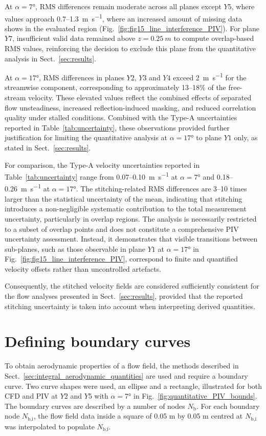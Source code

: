 \documentclass[wes, manuscript]{copernicus}
\begin{document}
At $\alpha = 7\unit{\degree}$, RMS differences remain moderate across all planes except $Y5$, where values approach 0.7–1.3~\unit{m s^{-1}}, where an increased amount of missing data shows in the evaluated region (Fig.~\ref{fig:fig15_line_interference_PIV}). For plane $Y7$, insufficient valid data remained above $z = 0.25~\unit{m}$ to compute overlap-based RMS values, reinforcing the decision to exclude this plane from the quantitative analysis in Sect.~\ref{sec:results}.

At $\alpha = 17\unit{\degree}$, RMS differences in planes $Y2$, $Y3$ and $Y4$ exceed 2~\unit{m s^{-1}} for the streamwise component, corresponding to approximately 13–18\% of the free-stream velocity. These elevated values reflect the combined effects of separated flow unsteadiness, increased reflection-induced masking, and reduced correlation quality under stalled conditions. Combined with the Type-A uncertainties reported in Table~\ref{tab:uncertainty}, these observations provided further justification for limiting the quantitative analysis at $\alpha = 17\unit{\degree}$ to plane $Y1$ only, as stated in Sect.~\ref{sec:results}.

For comparison, the Type-A velocity uncertainties reported in Table~\ref{tab:uncertainty} range from 0.07–0.10~\unit{m s^{-1}} at $\alpha=7\unit{\degree}$ and 0.18–0.26~\unit{m s^{-1}} at $\alpha=17\unit{\degree}$. The stitching-related RMS differences are 3–10 times larger than the statistical uncertainty of the mean, indicating that stitching introduces a non-negligible systematic contribution to the total measurement uncertainty, particularly in overlap regions. The analysis is necessarily restricted to a subset of overlap points and does not constitute a comprehensive PIV uncertainty assessment. Instead, it demonstrates that visible transitions between sub-planes, such as those observable in plane $Y1$ at $\alpha=17\unit{\degree}$ in Fig.~\ref{fig:fig15_line_interference_PIV}, correspond to finite and quantified velocity offsets rather than uncontrolled artefacts.

Consequently, the stitched velocity fields are considered sufficiently consistent for the flow analyses presented in Sect.~\ref{sec:results}, provided that the reported stitching uncertainty is taken into account when interpreting derived quantities.
%
\section{Defining boundary curves}\label{sec:defining_boundary_curves}
%
To obtain aerodynamic properties of a flow field, the methods described in Sect.~\ref{sec:integral_aerodynamic_quantities} are used and require a boundary curve. Two curve shapes were used, an ellipse and a rectangle, illustrated for both CFD and PIV at $Y2$ and $Y5$ with $\alpha=7\unit{\degree}$ in Fig.~\ref{fig:quantitative_PIV_bounds}.
The boundary curves are described by a number of nodes $N_{\textrm{b}}$.
For each boundary node $N_{\textrm{b,i}}$, the flow field data inside a square of 0.05 \unit{m} by 0.05 \unit{m} centred at $N_{\textrm{b,i}}$ was interpolated to populate $N_{\textrm{b,i}}$.
\end{document}
